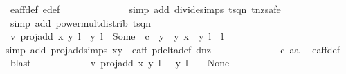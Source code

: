 \begin{isabellebody}
\ e{\isacharunderscore}aff{\isacharunderscore}def\ e{\isacharprime}{\isacharunderscore}def\ \isanewline
\ \ \ \ \ \ \ \ \ \ \ \ \isamarkupfalse%
{\isacharparenleft}simp\ add{\isacharcolon}\ divide{\isacharunderscore}simps\ t{\isacharunderscore}sq{\isacharunderscore}n{}\ t{\isacharunderscore}nz{\isacharcomma}safe{\isacharparenright}\isanewline
\ \ \ \ \ \ \ \ \ \ \ \ \isamarkupfalse%
\ {\isacharparenleft}simp\ add{\isacharcolon}\ power{\isacharunderscore}mult{\isacharunderscore}distrib\ t{\isacharunderscore}sq{\isacharunderscore}n{}{\isacharparenright}\isanewline
\ \ \ \ \ \ \ \ \ \ \isamarkupfalse%
\ v{}{\isacharcolon}\ {\isachardoublequoteopen}proj{\isacharunderscore}add\ {\isacharparenleft}{\isacharparenleft}x{\isacharcomma}\ y{\isacharparenright}{\isacharcomma}\ l{\isacharparenright}\ {\isacharparenleft}{\isacharparenleft}{}{\isacharcomma}\ y{\isacharprime}{\isacharparenright}{\isacharcomma}\ l{\isacharprime}{\isacharparenright}\ {\isacharequal}\ Some\ {\isacharparenleft}{\isacharparenleft}{\isacharminus}\ {\isacharparenleft}c\ {\isacharasterisk}\ y\ {\isacharasterisk}\ y{\isacharprime}{\isacharparenright}{\isacharcomma}\ x\ {\isacharasterisk}\ y{\isacharprime}{\isacharparenright}{\isacharcomma}\ l\ {\isacharplus}\ l{\isacharprime}{\isacharparenright}{\isachardoublequoteclose}\isanewline
\ \ \ \ \ \ \ \ \ \ \ \ \isamarkupfalse%
{\isacharparenleft}simp\ add{\isacharcolon}\ proj{\isacharunderscore}add{\isachardot}simps\ {\isacartoucheopen}{\isacharparenleft}x{\isacharcomma}y{\isacharparenright}\ {\isasymin}\ e{\isacharunderscore}aff{\isacartoucheclose}\ p{\isacharunderscore}delta{\isacharunderscore}def\ d{\isacharunderscore}{}{\isacharunderscore}nz{\isacharparenright}\isanewline
\ \ \ \ \ \ \ \ \ \ \ \ \isamarkupfalse%
\ c\ aa\ \isamarkupfalse%
\ e{\isacharunderscore}aff{\isacharunderscore}{}{\isacharunderscore}def\ \isamarkupfalse%
\ blast\isanewline
\ \ \ \ \ \ \ \ \ \ \isamarkupfalse%
\ v{}{\isacharcolon}\ {\isachardoublequoteopen}proj{\isacharunderscore}add\ {\isacharparenleft}{\isacharparenleft}x{\isacharcomma}\ y{\isacharparenright}{\isacharcomma}\ l{\isacharparenright}\ {\isacharparenleft}{\isasymtau}\ {\isacharparenleft}{}{\isacharcomma}\ y{\isacharprime}{\isacharparenright}{\isacharcomma}\ l{\isacharprime}\ {\isacharplus}\ {}{\isacharparenright}\ {\isacharequal}\ None{\isachardoublequoteclose}\isanewline

\end{isabellebody}
